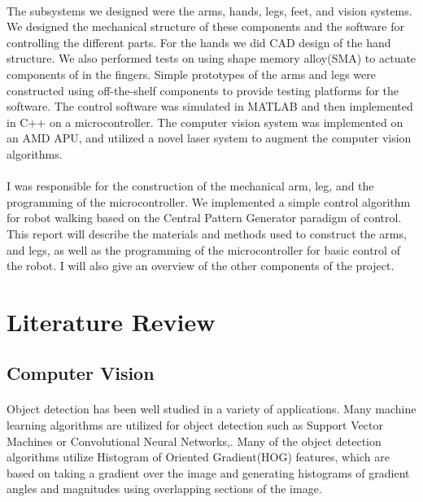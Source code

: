 \documentclass[letterpaper,12pt]{article}
\begin{document}
\paragraph{}The subsystems we designed were the arms, hands, legs, feet, and
vision systems.  We designed the mechanical structure of these components and
the software for controlling the different parts. For the hands we did CAD
design of the hand structure. We also performed tests on using shape memory
alloy(SMA) to actuate components of in the fingers. Simple prototypes of the
arms and legs were constructed using off-the-shelf components to provide testing
platforms for the software. The control software was simulated in MATLAB and
then implemented in C++ on a microcontroller. The computer vision system was
implemented on an AMD APU, and utilized a novel laser system to augment the
computer vision algorithms.

\paragraph{}I was responsible for the construction of the mechanical arm, leg,
and the programming of the microcontroller. We implemented a simple control
algorithm for robot walking based on the Central Pattern Generator paradigm of
control.  This report will describe the materials and methods used to construct
the arms, and legs, as well as the programming of the microcontroller for basic
control of the robot. I will also give an overview of the other components of
the project.

\section{Literature Review}
\subsection{Computer Vision}
\paragraph{}Object detection has been well studied in a variety of applications.
Many machine learning algorithms are utilized for object detection such as
Support Vector Machines or Convolutional Neural
Networks\cite{Barbu2012},\cite{krizhevsky2012imagenet}. Many of the object
detection algorithms utilize Histogram of Oriented Gradient(HOG) features, which
are based on taking a gradient over the image and generating histograms of
gradient angles and magnitudes using overlapping sections of the
image\cite{Dalal2005}. 
\end{document}
